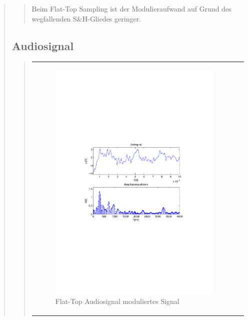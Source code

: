 \begin{quote}
\begin{quote}
       Beim Flat-Top Sampling ist der Modulieraufwand auf Grund des wegfallenden S\&H-Gliedes geringer.
       
    
      \end{quote}
      
      \subsection{Audiosignal}
      \begin{quote}
      
      \begin{center}
            \begin{tabular}{ll}
            
            \hspace{-5cm}
                \begin{minipage}{0.6\textwidth}
                    \begin{figure}[H]
                        \includegraphics[scale=0.7, trim = 35mm 100mm 35mm 95mm, clip]{Bilder/audioflatabget_zeit}
                          \caption{Flat-Top Audiosignal moduliertes Signal}
		                  \label{fig:flataudiozeit}
                    \end{figure}
                \end{minipage}
                

\end{tabular}
\end{center}
\end{quote}
\end{quote}
